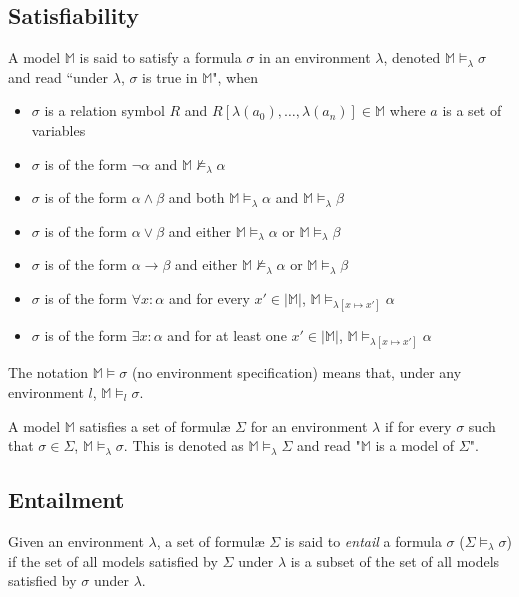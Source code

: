 	\subsection{Satisfiability}

		A model $\mathbb{M}$ is said to satisfy a formula $\sigma$ in an
		environment $\lambda$, denoted $\mathbb{M} \models_\lambda \sigma$ and
		read ``under $\lambda$, $\sigma$ is true in $\mathbb{M}$", when
		\begin{itemize}
		\item $\sigma$ is a relation symbol $R$ and $R[\lambda(a_0) , \ldots , \lambda(a_n)] \in \mathbb{M}$ where $a$ is a set of variables
		\item $\sigma$ is of the form $\neg\alpha$ and $\mathbb{M} \not\models_\lambda \alpha$
		\item $\sigma$ is of the form $\alpha\wedge\beta$ and both $\mathbb{M} \models_\lambda \alpha$ and $\mathbb{M} \models_\lambda \beta$
		\item $\sigma$ is of the form $\alpha\vee\beta$ and either $\mathbb{M} \models_\lambda \alpha$ or $\mathbb{M} \models_\lambda \beta$
		\item $\sigma$ is of the form $\alpha\to\beta$ and either $\mathbb{M} \not\models_\lambda \alpha$ or $\mathbb{M} \models_\lambda \beta$
		\item $\sigma$ is of the form $\forall x : \alpha$  and for every $x' \in |\mathbb{M}|$, $\mathbb{M} \models_{\lambda[x \mapsto x']} \alpha$
		\item $\sigma$ is of the form $\exists x : \alpha$  and for at least one $x' \in |\mathbb{M}|$, $\mathbb{M} \models_{\lambda[x \mapsto x']} \alpha$
		\end{itemize}
		The notation $\mathbb{M} \models \sigma$ (no environment specification)
		means that, under any environment $l$, $\mathbb{M} \models_l \sigma$.

		A model $\mathbb{M}$ satisfies a set of formul{\ae} $\Sigma$ for an
		environment $\lambda$ if for every $\sigma$ such that $\sigma \in
		\Sigma$, $\mathbb{M} \models_\lambda \sigma$. This is denoted as
		$\mathbb{M} \models_\lambda \Sigma$ and read "$\mathbb{M}$ is a model
		of $\Sigma$".

	\subsection{Entailment}

		Given an environment $\lambda$, a set of formul{\ae} $\Sigma$ is said
		to \emph{entail} a formula $\sigma$ ($\Sigma \models_\lambda \sigma$)
		if the set of all models satisfied by $\Sigma$ under $\lambda$ is a
		subset of the set of all models satisfied by $\sigma$ under $\lambda$.

